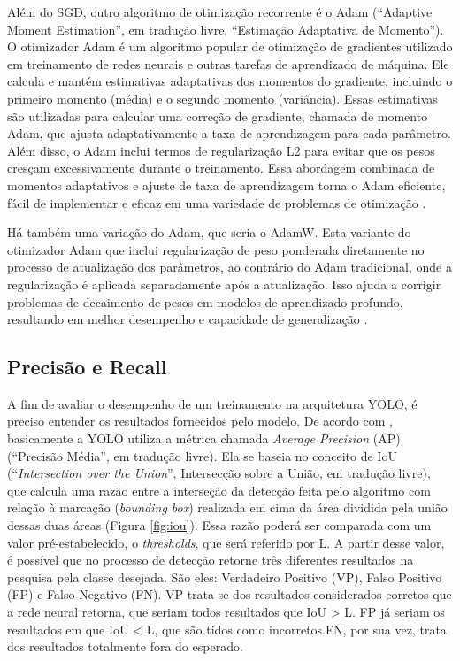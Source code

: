 Além do SGD, outro algoritmo de otimização recorrente é o Adam (“Adaptive Moment Estimation”, em tradução livre, “Estimação Adaptativa de Momento”). O otimizador Adam é um algoritmo popular de otimização de gradientes utilizado em treinamento de redes neurais e outras tarefas de aprendizado de máquina. Ele calcula e mantém estimativas adaptativas dos momentos do gradiente, incluindo o primeiro momento (média) e o segundo momento (variância). Essas estimativas são utilizadas para calcular uma correção de gradiente, chamada de momento Adam, que ajusta adaptativamente a taxa de aprendizagem para cada parâmetro. Além disso, o Adam inclui termos de regularização L2 para evitar que os pesos cresçam excessivamente durante o treinamento. Essa abordagem combinada de momentos adaptativos e ajuste de taxa de aprendizagem torna o Adam eficiente, fácil de implementar e eficaz em uma variedade de problemas de otimização \cite{kingma2014adam}.

Há também uma variação do Adam, que seria o AdamW. Esta variante do otimizador Adam que inclui regularização de peso ponderada diretamente no processo de atualização dos parâmetros, ao contrário do Adam tradicional, onde a regularização é aplicada separadamente após a atualização. Isso ajuda a corrigir problemas de decaimento de pesos em modelos de aprendizado profundo, resultando em melhor desempenho e capacidade de generalização \cite{zhou2024towards}.

\subsection{Precisão e Recall}
\label{sec:precisaorecall}

A fim de avaliar o desempenho de um treinamento na arquitetura YOLO, é preciso entender os resultados fornecidos pelo modelo. De acordo com \cite{padilla2020survey}, basicamente a YOLO utiliza a métrica chamada \textit{Average Precision} (AP) (“Precisão Média”, em tradução livre). Ela se baseia no conceito de IoU (“\textit{Intersection over the Union}”, Intersecção sobre a União, em tradução livre), que calcula uma razão entre a interseção da detecção feita pelo algoritmo com relação à marcação (\textit{bounding box}) realizada em cima da área dividida pela união dessas duas áreas (Figura \ref{fig:iou}). Essa razão poderá ser comparada com um valor pré-estabelecido, o \textit{thresholds}, que será referido por L. A partir desse valor, é possível que no processo de detecção retorne três diferentes resultados na pesquisa pela classe desejada. São eles: Verdadeiro Positivo (VP), Falso Positivo (FP) e Falso Negativo (FN). VP trata-se dos resultados considerados corretos que a rede neural retorna, que seriam todos resultados que IoU > L. FP já seriam os resultados em que IoU < L, que são tidos como incorretos.FN, por sua vez, trata dos resultados totalmente fora do esperado.

